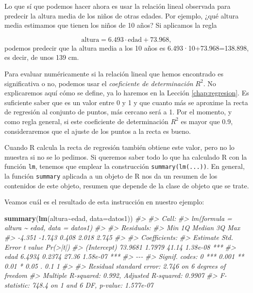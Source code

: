 \documentclass[
]{book}
\newenvironment{Shaded}{\begin{snugshade}}{\end{snugshade}}
\newcommand{\CommentTok}[1]{\textcolor[rgb]{0.56,0.35,0.01}{\textit{#1}}}
\newcommand{\DataTypeTok}[1]{\textcolor[rgb]{0.13,0.29,0.53}{#1}}
\newcommand{\KeywordTok}[1]{\textcolor[rgb]{0.13,0.29,0.53}{\textbf{#1}}}
\newcommand{\NormalTok}[1]{#1}
\newcommand{\OperatorTok}[1]{\textcolor[rgb]{0.81,0.36,0.00}{\textbf{#1}}}
\theoremstyle{definition}
\theoremstyle{definition}
\theoremstyle{definition}
\theoremstyle{remark}
\begin{document}
Lo que sí que podemos hacer ahora es usar la relación lineal observada para predecir la altura media de los niños de otras edades. Por ejemplo, ¿qué altura media estimamos que tienen los niños de 10 años? Si aplicamos la regla

\[
\textrm{altura}=6.493\cdot \mathrm{edad}+73.968,
\]
podemos predecir que la altura media a los 10 años es
6.493·10+73.968=138.898, es decir, de unos 139 cm.

Para evaluar numéricamente si la relación lineal que hemos encontrado es significativa o no, podemos usar el \emph{coeficiente de determinación} \(R^2\). No explicaremos aquí cómo se define, ya lo haremos en la Lección \ref{chap:regresion}. Es suficiente saber que es un valor entre 0 y 1 y que cuanto más se aproxime la recta de regresión al conjunto de puntos, más cercano será a 1. Por el momento, y como regla general, si este coeficiente de determinación \(R^2\) es mayor que 0.9, consideraremos que el ajuste de los puntos a la recta es bueno.

Cuando R calcula la recta de regresión también obtiene este valor, pero no lo muestra si no se lo pedimos. Si queremos saber todo lo que ha calculado R con la función \texttt{lm}, tenemos que emplear la construcción \texttt{summary(lm(...))}. En general, la función \texttt{summary} aplicada a un objeto de R nos da un resumen de los contenidos de este objeto, resumen que depende de la clase de objeto que se trate.

Veamos cuál es el resultado de esta instrucción en nuestro ejemplo:

\begin{Shaded}
\begin{Highlighting}[]
\KeywordTok{summary}\NormalTok{(}\KeywordTok{lm}\NormalTok{(altura}\OperatorTok{\textasciitilde{}}\NormalTok{edad, }\DataTypeTok{data=}\NormalTok{datos1))}
\CommentTok{\#\textgreater{} }
\CommentTok{\#\textgreater{} Call:}
\CommentTok{\#\textgreater{} lm(formula = altura \textasciitilde{} edad, data = datos1)}
\CommentTok{\#\textgreater{} }
\CommentTok{\#\textgreater{} Residuals:}
\CommentTok{\#\textgreater{}    Min     1Q Median     3Q    Max }
\CommentTok{\#\textgreater{} {-}4.351 {-}1.743  0.408  2.018  2.745 }
\CommentTok{\#\textgreater{} }
\CommentTok{\#\textgreater{} Coefficients:}
\CommentTok{\#\textgreater{}             Estimate Std. Error t value Pr(\textgreater{}|t|)    }
\CommentTok{\#\textgreater{} (Intercept)  73.9681     1.7979   41.14 1.38e{-}08 ***}
\CommentTok{\#\textgreater{} edad          6.4934     0.2374   27.36 1.58e{-}07 ***}
\CommentTok{\#\textgreater{} {-}{-}{-}}
\CommentTok{\#\textgreater{} Signif. codes:  0 \textquotesingle{}***\textquotesingle{} 0.001 \textquotesingle{}**\textquotesingle{} 0.01 \textquotesingle{}*\textquotesingle{} 0.05 \textquotesingle{}.\textquotesingle{} 0.1 \textquotesingle{} \textquotesingle{} 1}
\CommentTok{\#\textgreater{} }
\CommentTok{\#\textgreater{} Residual standard error: 2.746 on 6 degrees of freedom}
\CommentTok{\#\textgreater{} Multiple R{-}squared:  0.992,  Adjusted R{-}squared:  0.9907 }
\CommentTok{\#\textgreater{} F{-}statistic: 748.4 on 1 and 6 DF,  p{-}value: 1.577e{-}07}
\end{Highlighting}
\end{Shaded}
\end{document}
